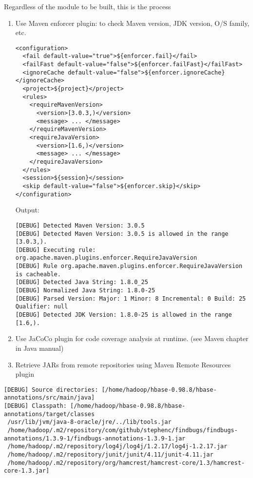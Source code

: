 Regardless of the module to be built, this is the process
\begin{enumerate}
  \item Use Maven enforcer plugin: to check Maven version, JDK version, O/S
  family, etc.
\begin{verbatim}
<configuration>
  <fail default-value="true">${enforcer.fail}</fail>
  <failFast default-value="false">${enforcer.failFast}</failFast>
  <ignoreCache default-value="false">${enforcer.ignoreCache}</ignoreCache>
  <project>${project}</project>
  <rules>
    <requireMavenVersion>
      <version>[3.0.3,)</version>
      <message> ... </message>
    </requireMavenVersion>
    <requireJavaVersion>
      <version>[1.6,)</version>
      <message> ... </message>
    </requireJavaVersion>
  </rules>
  <session>${session}</session>
  <skip default-value="false">${enforcer.skip}</skip>
</configuration>
\end{verbatim}

Output:
\begin{verbatim}
[DEBUG] Detected Maven Version: 3.0.5
[DEBUG] Detected Maven Version: 3.0.5 is allowed in the range [3.0.3,).
[DEBUG] Executing rule: org.apache.maven.plugins.enforcer.RequireJavaVersion
[DEBUG] Rule org.apache.maven.plugins.enforcer.RequireJavaVersion is cacheable.
[DEBUG] Detected Java String: 1.8.0_25
[DEBUG] Normalized Java String: 1.8.0-25
[DEBUG] Parsed Version: Major: 1 Minor: 8 Incremental: 0 Build: 25 Qualifier: null
[DEBUG] Detected JDK Version: 1.8.0-25 is allowed in the range [1.6,).

\end{verbatim}

  \item Use JaCoCo plugin for code coverage analysis at runtime. (see Maven
  chapter in Java manual)
  
  \item Retrieve JARs from remote repositories using Maven Remote Resources
  plugin
  
\end{enumerate}

\begin{Verbatim}
[DEBUG] Source directories: [/home/hadoop/hbase-0.98.8/hbase-annotations/src/main/java]
[DEBUG] Classpath: [/home/hadoop/hbase-0.98.8/hbase-annotations/target/classes
 /usr/lib/jvm/java-8-oracle/jre/../lib/tools.jar
 /home/hadoop/.m2/repository/com/github/stephenc/findbugs/findbugs-annotations/1.3.9-1/findbugs-annotations-1.3.9-1.jar
 /home/hadoop/.m2/repository/log4j/log4j/1.2.17/log4j-1.2.17.jar
 /home/hadoop/.m2/repository/junit/junit/4.11/junit-4.11.jar
 /home/hadoop/.m2/repository/org/hamcrest/hamcrest-core/1.3/hamcrest-core-1.3.jar]
\end{Verbatim}

